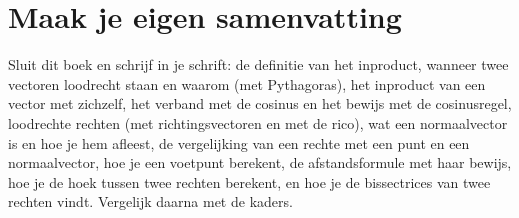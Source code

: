 \ifzelfstudie
\section*{Maak je eigen samenvatting}
Sluit dit boek en schrijf in je schrift: de definitie van het inproduct, wanneer twee vectoren loodrecht staan en waarom (met Pythagoras), het inproduct van een vector met zichzelf, het verband met de cosinus en het bewijs met de cosinusregel, loodrechte rechten (met richtingsvectoren en met de rico), wat een normaalvector is en hoe je hem afleest, de vergelijking van een rechte met een punt en een normaalvector, hoe je een voetpunt berekent, de afstandsformule met haar bewijs, hoe je de hoek tussen twee rechten berekent, en hoe je de bissectrices van twee rechten vindt. Vergelijk daarna met de kaders.
\fi
